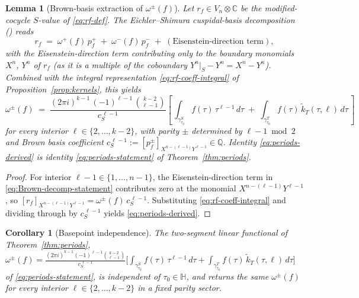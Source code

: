 \documentclass[11pt]{article}
\newtheorem{lemma}[theorem]{Lemma}
\newtheorem{corollary}[theorem]{Corollary}
\numberwithin{equation}{section}  %
\newcommand{\HH}{\mathbb{H}}
\newcommand{\QQ}{\mathbb{Q}}
\newcommand{\CC}{\mathbb{C}}
\begin{document}
\begin{lemma}[Brown-basis extraction of $\omega^\pm(f)$]\label{lem:brown-decomp}
Let $r_f \in V_n \otimes \CC$ be the modified-cocycle $S$-value of
\eqref{eq:rf-def}.  The Eichler--Shimura cuspidal-basis
decomposition (\cite{KZ1984,Brown2017}) reads
\begin{equation}\label{eq:Brown-decomp-statement}
  r_f \;=\; \omega^+(f)\,p^+_f \;+\; \omega^-(f)\,p^-_f \;+\; (\text{Eisenstein-direction term}),
\end{equation}
with the Eisenstein-direction term contributing only to the boundary
monomials $X^n$, $Y^n$ of $r_f$ (as it is a multiple of the coboundary
$Y^n|_S - Y^n = X^n - Y^n$).  Combined with the integral
representation \eqref{eq:rf-coeff-integral} of
Proposition~\ref{prop:kernels}, this yields
\begin{equation}\label{eq:periods-derived}
  \omega^\pm(f)
  \;=\; \frac{(2\pi i)^{k - 1}\,(-1)^{\ell - 1}\,\binom{k - 2}{\ell - 1}}{c_S^{\,\ell - 1}}\!
  \left[\,\int_{\gamma^S_{\tau_0}}\! f(\tau)\,\tau^{\ell - 1}\,d\tau
        \;+\; \int_{\gamma^T_{\tau_0}}\! f(\tau)\,\widetilde{k}_T(\tau, \ell)\,d\tau\,\right]
\end{equation}
for every interior $\ell \in \{2, \ldots, k - 2\}$, with parity $\pm$
determined by $\ell - 1 \bmod 2$ and Brown basis coefficient
$c_S^{\,\ell - 1} := [p^\pm_f]_{X^{n - (\ell - 1)} Y^{\ell - 1}} \in \QQ$.
Identity \eqref{eq:periods-derived} is identity
\eqref{eq:periods-statement} of Theorem~\ref{thm:periods}.
\end{lemma}

\begin{proof}
For interior $\ell - 1 \in \{1, \ldots, n - 1\}$, the
Eisenstein-direction term in \eqref{eq:Brown-decomp-statement}
contributes zero at the monomial $X^{n - (\ell - 1)} Y^{\ell - 1}$, so
$[r_f]_{X^{n - (\ell - 1)} Y^{\ell - 1}} = \omega^\pm(f)\,c_S^{\,\ell - 1}$.
Substituting \eqref{eq:rf-coeff-integral} and dividing through by
$c_S^{\,\ell - 1}$ yields \eqref{eq:periods-derived}.
\end{proof}

\begin{corollary}[Basepoint independence]\label{cor:tau0-ell-indep}
The two-segment linear functional of Theorem~\ref{thm:periods},
$\omega^\pm(f) = \frac{(2\pi i)^{k - 1}(-1)^{\ell - 1}\binom{k - 2}{\ell - 1}}{c_S^{\,\ell - 1}}\!\bigl[\int_{\gamma^S_{\tau_0}}\!f(\tau)\,\tau^{\ell - 1}\,d\tau + \int_{\gamma^T_{\tau_0}}\!f(\tau)\,\widetilde{k}_T(\tau, \ell)\,d\tau\bigr]$
of \eqref{eq:periods-statement}, is independent of $\tau_0 \in \HH$, and
returns the same $\omega^\pm(f)$ for every interior
$\ell \in \{2, \ldots, k - 2\}$ in a fixed parity sector.
\end{corollary}
\end{document}
